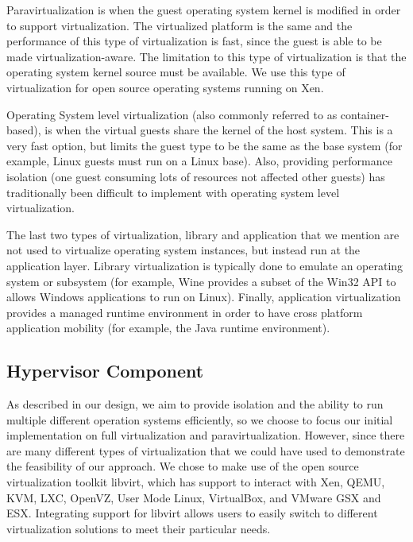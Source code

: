 Paravirtualization is when the guest operating system kernel is modified in order to support virtualization. The virtualized platform is the same and the performance of this type of virtualization is fast, since the guest is able to be made virtualization-aware.  The limitation to this type of virtualization is that the operating system kernel source must be available. We use this type of virtualization for open source operating systems running on Xen.

Operating System level virtualization (also commonly referred to as container-based), is when the virtual guests share the kernel of the host system. This is a very fast option, but limits the guest type to be the same as the base system (for example, Linux guests must run on a Linux base). Also, providing performance isolation (one guest consuming lots of resources not affected other guests) has traditionally been difficult to implement with operating system level virtualization. 

The last two types of virtualization, library and application that we mention are not used to virtualize operating system instances, but instead run at the application layer. Library virtualization is typically done to emulate an operating system or subsystem (for example, Wine provides a subset of the Win32 API to allows Windows applications to run on Linux). Finally, application virtualization provides a managed runtime environment in order to have cross platform application mobility (for example, the Java runtime environment).

\subsection{Hypervisor Component}

As described in our design, we aim to provide isolation and the ability to run multiple different operation systems efficiently, so we choose to focus our initial implementation on full virtualization and paravirtualization. However, since there are many different types of virtualization that we could have used to demonstrate the feasibility of our approach.  We chose to make use of the open source virtualization toolkit libvirt, which has support to interact with Xen, QEMU, KVM, LXC, OpenVZ, User Mode Linux, VirtualBox, and VMware GSX and ESX\cite{libvirt_website}. Integrating support for libvirt allows users to easily switch to different virtualization solutions to meet their particular needs.

